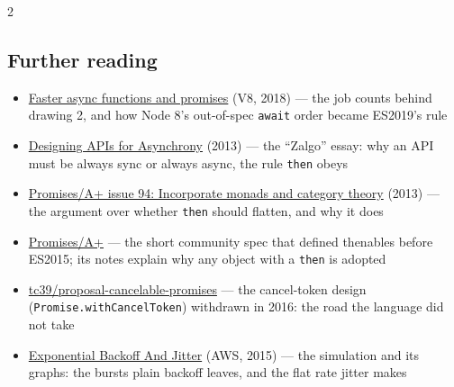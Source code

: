 \documentclass[8pt]{extarticle}
\begin{document}
\begin{multicols}{2}
\begin{htmlonly}
\section{Further reading}
\begin{itemize}
  \item \href{https://v8.dev/blog/fast-async}{Faster async functions and promises} (V8, 2018) —
        the job counts behind drawing 2, and how Node 8's out-of-spec \texttt{await} order became
        ES2019's rule
  \item \href{https://blog.izs.me/2013/08/designing-apis-for-asynchrony/}{Designing APIs for Asynchrony}
        (2013) — the ``Zalgo'' essay: why an API must be always sync or always async, the rule
        \texttt{then} obeys
  \item \href{https://github.com/promises-aplus/promises-spec/issues/94}{Promises/A+ issue 94: Incorporate monads and category theory}
        (2013) — the argument over whether \texttt{then} should flatten, and why it does
  \item \href{https://promisesaplus.com/}{Promises/A+} — the short community spec that defined
        thenables before ES2015; its notes explain why any object with a \texttt{then} is adopted
  \item \href{https://github.com/tc39/proposal-cancelable-promises}{tc39/proposal-cancelable-promises}
        — the cancel-token design (\texttt{Promise.withCancelToken}) withdrawn in 2016: the road
        the language did not take
  \item \href{https://aws.amazon.com/blogs/architecture/exponential-backoff-and-jitter/}{Exponential Backoff And Jitter}
        (AWS, 2015) — the simulation and its graphs: the bursts plain backoff leaves, and the
        flat rate jitter makes
\end{itemize}
\end{htmlonly}

\end{multicols}

\end{document}
